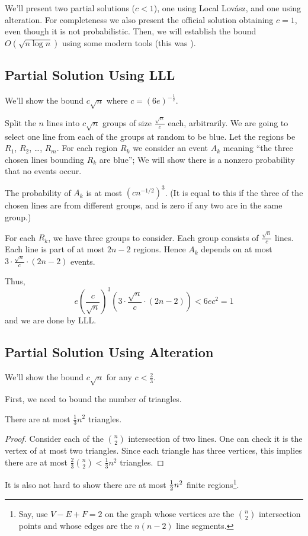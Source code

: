 \documentclass[11pt]{scrartcl}
\begin{document}
We'll present two partial solutions ($c < 1$), one using Local Lov\'asz, and one using alteration.
For completeness we also present the official solution obtaining $c=1$, even though it is not probabilistic.
Then, we will establish the bound $O(\sqrt{n \log n})$ using some modern tools (this was \cite{potalk}).

\subsection{Partial Solution Using LLL}
We'll show the bound $c \sqrt n$ where $c = (6e)^{-\frac12}$. 

Split the $n$ lines into $c \sqrt n$
groups of size $\frac{\sqrt n}{c}$ each, arbitrarily.
We are going to select one line from each of the groups at random to be blue.
Let the regions be $R_1$, $R_2$, \dots, $R_m$.
For each region $R_k$ we consider an event $A_k$ meaning
``the three chosen lines bounding $R_k$ are blue'';
We will show there is a nonzero probability that no events occur.

The probability of $A_k$ is at most $\left( cn^{-1/2} \right)^3$.
(It is equal to this if the three of the chosen lines are from different groups,
and is zero if any two are in the same group.)

For each $R_k$, we have three groups to consider.
Each group consists of $\frac{\sqrt n}{c}$ lines.
Each line is part of at most $2n-2$ regions.
Hence $A_k$ depends on at most $3 \cdot \frac{\sqrt n}{c} \cdot (2n-2)$ events.

Thus,
\[ e \left( \frac{c}{\sqrt n} \right)^3 \left( 3 \cdot \frac{\sqrt{n}}{c} \cdot (2n-2) \right)
	< 6ec^2 = 1 \]
and we are done by LLL.

\subsection{Partial Solution Using Alteration}
We'll show the bound $c \sqrt n$ for any $c < \frac 23$.

First, we need to bound the number of triangles.
\begin{claim*}
	There are at most $\frac 13 n^2$ triangles.
\end{claim*}
\begin{proof}
	Consider each of the $\binom n2$ intersection of two lines.
	One can check it is the vertex of at most two triangles.
	Since each triangle has three vertices,
	this implies there are at most $\frac 23 \binom n2 < \frac{1}{3} n^2$ triangles.
\end{proof}
It is also not hard to show there are at most $\frac{1}{2} n^2$ finite regions\footnote{Say, use $V-E+F=2$ on the graph whose vertices are the $\binom n2$ intersection points and whose edges are the $n(n-2)$ line segments.}.
\end{document}
